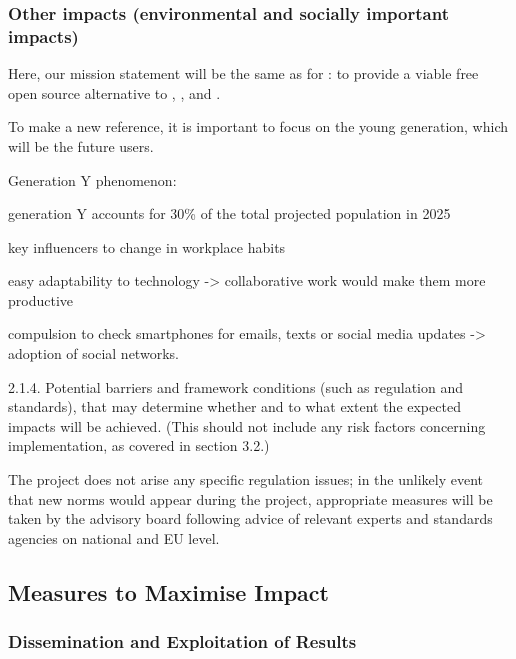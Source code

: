 \subsubsection{Other impacts (environmental and socially important impacts)}


Here, our mission statement will be the same as for \Sage: to provide
a viable free open source alternative to \Magma, \Maple, \Mathematica
and \Matlab.

To make \TheProject a new reference, it is important to focus on the young
generation, which will be the future users.

Generation Y phenomenon:

\begin{compactenum}
\item generation Y accounts for 30\% of the total projected population
in 2025
\item key influencers to change in workplace habits
\item easy adaptability to technology -{\textgreater} collaborative work
would make them more productive
\item compulsion to check smartphones for emails, texts or social media
updates -{\textgreater} adoption of social networks.
\end{compactenum}
2.1.4. Potential barriers and framework conditions (such as regulation
and standards), that may determine whether and to what extent the
expected impacts will be achieved. (This should not include any risk
factors concerning implementation, as covered in section 3.2.)

The project does not arise any specific regulation issues; in the
unlikely event that new norms would appear during the project,
appropriate measures will be taken by the advisory board following
advice of relevant experts and standards agencies on national and EU
level.

\subsection{Measures to Maximise Impact}

\subsubsection{Dissemination and Exploitation of Results}
\label{subsubsect:dissemination}

